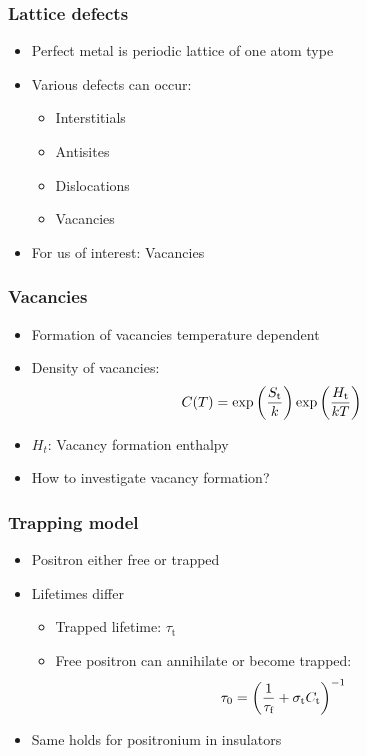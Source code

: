 \documentclass[english, fleqn]{beamer}
\begin{document}
\begin{frame}
    \frametitle{Lattice defects}
    \begin{itemize}
        \item 
            Perfect metal is periodic lattice of one atom type
        \item
            Various defects can occur:
            \begin{itemize}
                \item
                    Interstitials
                \item
                    Antisites
                \item
                    Dislocations
                \item
                    Vacancies
            \end{itemize}
        \pause
        \item
            For us of interest: Vacancies
    \end{itemize}
\end{frame}

\begin{frame}
    \frametitle{Vacancies}
    \begin{itemize}
        \item
            Formation of vacancies temperature dependent
        \item
            Density of vacancies:
            \[
                C(T)=\exp\left( \frac{S_\text{t}}k \right)\exp\left( \frac{H_\text{t}}{kT} \right)
            \]
        \item
            $H_t$: Vacancy formation enthalpy
        \pause
        \item
            How to investigate vacancy formation?
   \end{itemize}
\end{frame}

\begin{frame}
    \frametitle{Trapping model}
    \begin{itemize}
        \item 
            Positron either free or trapped
        \item
            Lifetimes differ
            \begin{itemize}
                \item 
                    Trapped lifetime: $\tau_\text{t}$
                \item 
                    Free positron can annihilate or become trapped: 
                    \[
                        \tau_0 = \left( \frac1{\tau_\text{f}}
                        + \sigma_\text{t}C_\text{t} \right)^{-1}
                    \]
            \end{itemize}
        \item
            Same holds for positronium in insulators
    \end{itemize}
\end{frame}
\end{document}
